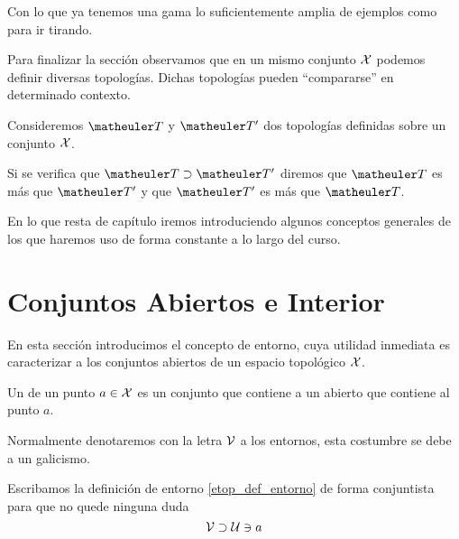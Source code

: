 \begin{exa}[Topologías]
\begin{enumerate}
		
	\end{enumerate}
	Con lo que ya tenemos una gama lo suficientemente amplia de ejemplos como para ir tirando.
\end{exa}
Para finalizar la sección observamos que en un mismo conjunto $\mathcal{X}$ podemos definir diversas topologías. Dichas topologías pueden ``compararse'' en determinado contexto.
\begin{defi}
	Consideremos $\T$ y $\T'$ dos topologías definidas sobre un conjunto $\mathcal{X}$.
	
	Si se verifica que $\T \supset \T'$ diremos que $\T$ es más  que $\T'$ y que $\T'$ es más  que $\T$.
\end{defi}
En lo que resta de capítulo iremos introduciendo algunos conceptos generales de los que haremos uso de forma constante a lo largo del curso.
\section{Conjuntos Abiertos e Interior}
\label{etop_entornos}
En esta sección introducimos el concepto de entorno, cuya utilidad inmediata es caracterizar a los conjuntos abiertos de un espacio topológico $\mathcal{X}$.
\begin{defi}
	\label{etop_def_entorno}
	Un  de un punto $a\in\mathcal{X}$ es un conjunto que contiene a un abierto que contiene al punto $a$.
\end{defi}
Normalmente denotaremos con la letra $\mathcal{V}$ a los entornos, esta costumbre se debe a un galicismo. %

Escribamos la definición de entorno \ref{etop_def_entorno} de forma conjuntista para que no quede ninguna duda
\begin{equation}
\label{etop_eq_entorno}
\mathcal{V}\supset\mathcal{U}\ni a
\end{equation}

